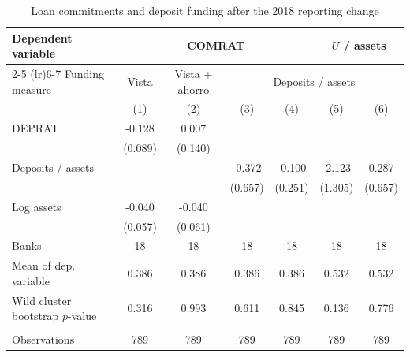 
\begin{table}[!h]
   \centering
   \small
   \begin{threeparttable}[b]
      \caption{\label{tab:krs_post2018} Loan commitments and deposit funding after the 2018 reporting change}
      \bigskip
      \begin{tabular}{lcccccc}
         \toprule
         Dependent variable & \multicolumn{4}{c}{COMRAT} & \multicolumn{2}{c}{$U$ / assets} \\ 
         \cmidrule(lr){2-5} \cmidrule(lr){6-7}
         Funding measure & Vista & Vista + ahorro & \multicolumn{4}{c}{Deposits / assets} \\ 
                                          & (1)           & (2)           & (3)           & (4)           & (5)           & (6)\\  
         \midrule 
         DEPRAT                           & -0.128        & 0.007         &               &               &               &   \\   
                                          & (0.089)       & (0.140)       &               &               &               &   \\   
         Deposits / assets                &               &               & -0.372        & -0.100        & -2.123        & 0.287\\   
                                          &               &               & (0.657)       & (0.251)       & (1.305)       & (0.657)\\   
         Log assets                       & -0.040        & -0.040        &               &               &               &   \\   
                                          & (0.057)       & (0.061)       &               &               &               &   \\   
         Banks                            & 18            & 18            & 18            & 18            & 18            & 18\\  
         Mean of dep. variable            & 0.386         & 0.386         & 0.386         & 0.386         & 0.532         & 0.532\\  
         Wild cluster bootstrap $p$-value & 0.316         & 0.993         & 0.611         & 0.845         & 0.136         & 0.776\\  
          \\
         Observations                     & 789           & 789           & 789           & 789           & 789           & 789\\  

\end{tabular}
\end{threeparttable}
\end{table}
